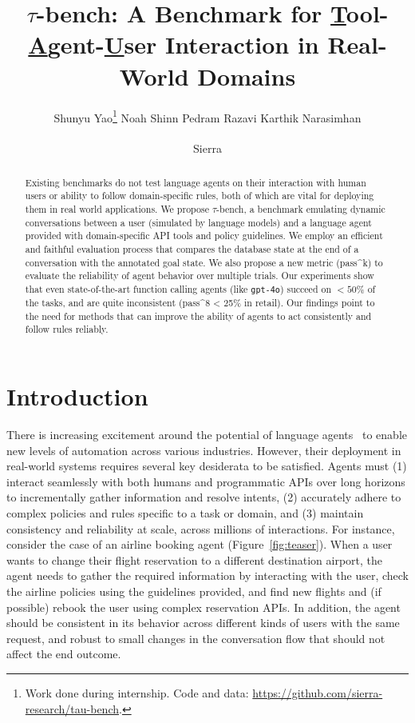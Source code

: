 \documentclass{article}
\title{{$\tau$}-bench: A Benchmark for \underline{T}ool-\underline{A}gent-\underline{U}ser Interaction in Real-World Domains}
\author{%
  Shunyu Yao\thanks{Work done during internship. Code and data: \url{https://github.com/sierra-research/tau-bench}.} \quad  \quad  Noah Shinn \quad  \quad Pedram Razavi \quad \quad  Karthik Narasimhan\\\\\large{Sierra}}
\newcommand{\benchmark}{$\tau$-bench}
\begin{document}
\maketitle


\begin{abstract}
Existing benchmarks do not test language agents on their interaction with human users or ability to follow domain-specific rules, both of which are vital for deploying them in real world applications. We propose \benchmark{}, a benchmark emulating dynamic conversations between a user (simulated by language models) and a language agent provided with domain-specific API tools and policy guidelines. 
We employ an efficient and faithful evaluation process that compares the database state at the end of a conversation with the annotated goal state. We also propose a new metric (pass\textasciicircum k) to evaluate the reliability of agent behavior over multiple trials. Our experiments show that even state-of-the-art function calling agents (like \texttt{gpt-4o}) succeed on $<50\%$ of the tasks, and are quite inconsistent (pass\textasciicircum 8 < 25\% in retail). Our findings point to the need for methods that can improve the ability of agents to act consistently and follow rules reliably.

\end{abstract}



\section{Introduction}

There is increasing excitement around the potential of language agents~\citep{sumers2023cognitive, yao2022react, schick2023toolformer, ahn2022can} to enable new levels of automation across various industries. However, their deployment in real-world systems requires several key desiderata to be satisfied. Agents must (1) interact seamlessly with both humans and programmatic APIs over long horizons to incrementally gather information and resolve intents,  (2)  accurately adhere to complex policies and rules specific to a task or domain, and (3) maintain consistency and reliability at scale, across millions of interactions.  For instance, consider the case of an airline booking agent (Figure~\ref{fig:teaser}). When a user wants to change their flight reservation to a different destination airport, the agent needs to gather the required information by interacting with the user, check the airline policies using the guidelines provided, and find new flights and (if possible) rebook the user using complex reservation APIs. In addition, the agent should be consistent in its behavior across different kinds of users with the same request, and robust to small changes in the conversation flow that should not affect the end outcome.
\end{document}
